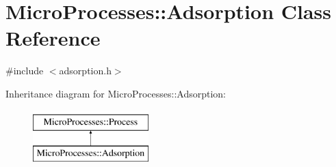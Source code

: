 \hypertarget{classMicroProcesses_1_1Adsorption}{}\section{Micro\+Processes\+:\+:Adsorption Class Reference}
\label{classMicroProcesses_1_1Adsorption}


{\ttfamily \#include $<$adsorption.\+h$>$}

Inheritance diagram for Micro\+Processes\+:\+:Adsorption\+:\begin{figure}[H]
\begin{center}
\leavevmode
\includegraphics[height=2.000000cm]{classMicroProcesses_1_1Adsorption}
\end{center}
\end{figure}

